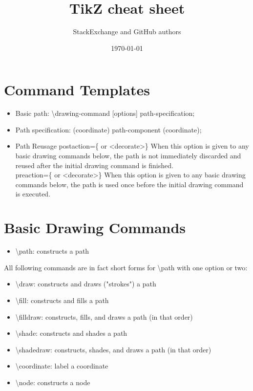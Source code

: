 \documentclass[a4paper,10pt]{article}
\newcommand{\myCode}[1]{\colorbox{gray!30}{#1}}
\begin{document}
\title{TikZ cheat sheet}
\author{StackExchange and GitHub authors}
\date{\today}

\section*{Command Templates}
\begin{itemize}
    \item Basic path: \myCode{\textbackslash drawing-command [options] path-specification;}
    \item Path specification: \myCode{(coordinate) path-component (coordinate);}
    \item Path Reusage  \myCode{postaction=\{<basic drawing commands> or <decorate>\}} When this option is given to any basic drawing commands below, the path is not immediately discarded and reused after the initial drawing command is finished. \\
            \myCode{preaction=\{<basic drawing commands> or <decorate>\}} When this option is given to any basic drawing commands below, the path is used once before the initial drawing command is executed.
\end{itemize}

\section*{Basic Drawing Commands}
\begin{itemize}
    \item \myCode{\textbackslash path}: constructs a path
\end{itemize}

All following commands are in fact short forms for \myCode{\textbackslash path} with one option or two:
\begin{itemize}
    \item \myCode{\textbackslash draw}: constructs and draws ("strokes") a path
    \item \myCode{\textbackslash fill}: constructs and fills a path
    \item \myCode{\textbackslash filldraw}: constructs, fills, and draws a path (in that order)
    \item \myCode{\textbackslash shade}: constructs and shades a path
    \item \myCode{\textbackslash shadedraw}: constructs, shades, and draws a path (in that order)
    \item \myCode{\textbackslash coordinate}: label a coordinate
    \item \myCode{\textbackslash node}: constructs a node
\end{itemize}
\end{document}

